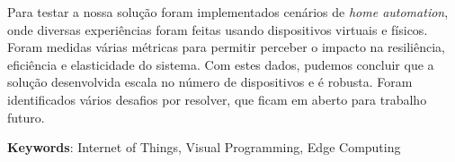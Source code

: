 Para testar a nossa solução foram implementados cenários de \textit{home automation}, onde diversas experiências foram feitas usando dispositivos virtuais e físicos. Foram medidas várias métricas para permitir perceber o impacto na resiliência, eficiência e elasticidade do sistema. Com estes dados, pudemos concluir que a solução desenvolvida escala no número de dispositivos e é robusta. Foram identificados vários desafios por resolver, que ficam em aberto para trabalho futuro.

\vspace*{10mm}\noindent

\textbf{Keywords}: Internet of Things, Visual Programming, Edge Computing
